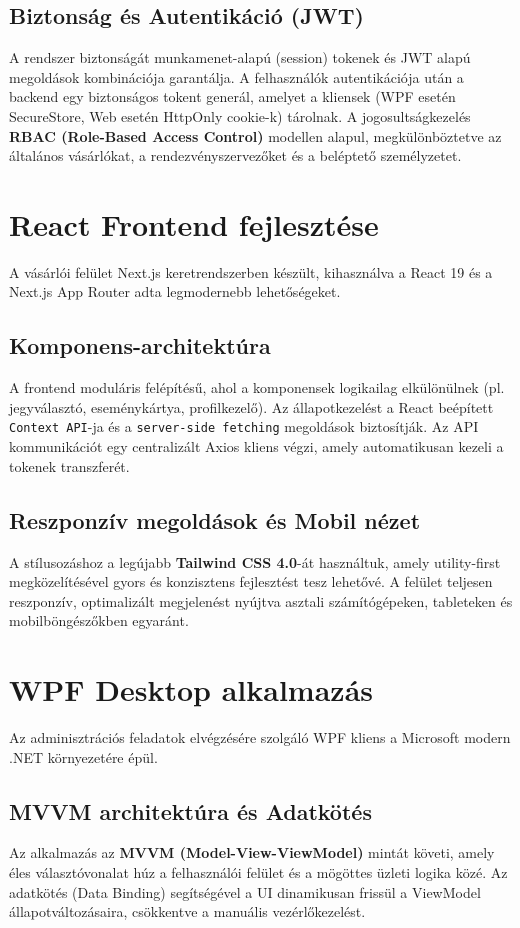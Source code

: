 \documentclass[colorlinks]{docs}
\theoremstyle{definition}
\theoremstyle{remark}
\begin{document}
\subsection{Biztonság és Autentikáció (JWT)}
A rendszer biztonságát munkamenet-alapú (session) tokenek és JWT alapú megoldások kombinációja garantálja. A felhasználók autentikációja után a backend egy biztonságos tokent generál, amelyet a kliensek (WPF esetén SecureStore, Web esetén HttpOnly cookie-k) tárolnak. A jogosultságkezelés \textbf{RBAC (Role-Based Access Control)} modellen alapul, megkülönböztetve az általános vásárlókat, a rendezvényszervezőket és a beléptető személyzetet.

\section{React Frontend fejlesztése}
A vásárlói felület Next.js keretrendszerben \cite{nextjs} készült, kihasználva a React 19 és a Next.js App Router adta legmodernebb lehetőségeket.

\subsection{Komponens-architektúra}
A frontend moduláris felépítésű, ahol a komponensek logikailag elkülönülnek (pl. jegyválasztó, eseménykártya, profilkezelő). Az állapotkezelést a React beépített \texttt{Context API}-ja és a \texttt{server-side fetching} megoldások biztosítják. Az API kommunikációt egy centralizált Axios kliens végzi, amely automatikusan kezeli a tokenek transzferét.

\subsection{Reszponzív megoldások és Mobil nézet}
A stílusozáshoz a legújabb \textbf{Tailwind CSS 4.0}-át \cite{tailwindcss} használtuk, amely utility-first megközelítésével gyors és konzisztens fejlesztést tesz lehetővé. A felület teljesen reszponzív, optimalizált megjelenést nyújtva asztali számítógépeken, tableteken és mobilböngészőkben egyaránt.

\section{WPF Desktop alkalmazás}
Az adminisztrációs feladatok elvégzésére szolgáló WPF kliens a Microsoft modern .NET környezetére \cite{dotnet10} épül.

\subsection{MVVM architektúra és Adatkötés}
Az alkalmazás az \textbf{MVVM (Model-View-ViewModel)} mintát \cite{gossman2005} követi, amely éles választóvonalat húz a felhasználói felület és a mögöttes üzleti logika közé. Az adatkötés (Data Binding) segítségével a UI dinamikusan frissül a ViewModel állapotváltozásaira, csökkentve a manuális vezérlőkezelést.
\end{document}
